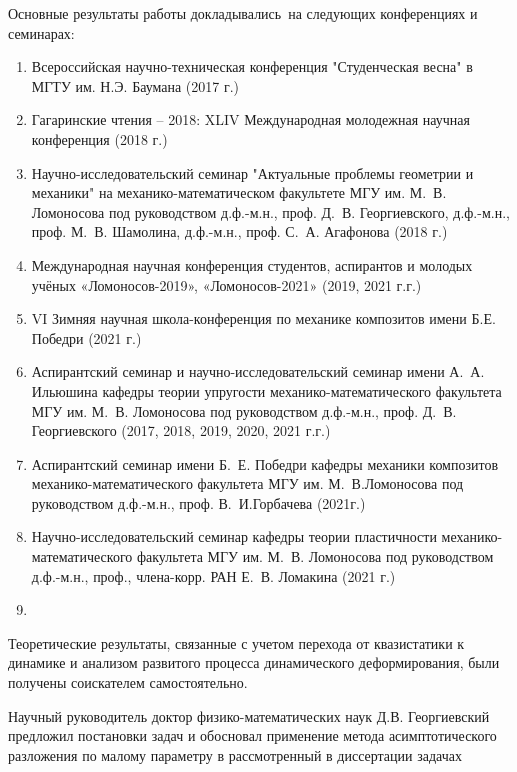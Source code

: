 {\probation}
Основные результаты работы докладывались~на следующих конференциях и семинарах:
\begin{enumerate}[beginpenalty=10000] %
    \item Всероссийская научно-техническая конференция "Студенческая весна" в МГТУ им. Н.Э. Баумана (2017 г.)
    \item Гагаринские чтения -- 2018: XLIV Международная молодежная научная конференция (2018 г.)
    \item Научно-исследовательский семинар "Актуальные проблемы геометрии и механики" на механико-математическом факультете МГУ им. М.~В. Ломоносова под руководством д.ф.-м.н., проф. Д.~В. Георгиевского, д.ф.-м.н., проф. М.~В. Шамолина, д.ф.-м.н., проф. С.~А. Агафонова (2018 г.)
    \item Международная научная конференция студентов, аспирантов и молодых учёных «Ломоносов-2019», «Ломоносов-2021» (2019, 2021 г.г.)
    \item VI Зимняя научная школа-конференция по механике композитов имени Б.Е. Победри (2021 г.)
    \item Аспирантский семинар и научно-исследовательский семинар имени А.~А. Ильюшина кафедры теории упругости механико-математического факультета МГУ им. М.~В. Ломоносова под руководством д.ф.-м.н., проф. Д.~В. Георгиевского (2017, 2018, 2019, 2020, 2021 г.г.)
    \item Аспирантский семинар имени Б.~Е. Победри кафедры механики композитов механико-математического факультета МГУ им. М.~В.Ломоносова под руководством д.ф.-м.н., проф. В.~И.Горбачева (2021г.)
    \item Научно-исследовательский семинар кафедры теории пластичности механико-математического факультета МГУ им. М.~В. Ломоносова под руководством д.ф.-м.н., проф., члена-корр. РАН Е.~В. Ломакина (2021 г.)
    \item {}
\end{enumerate}

{\contribution} Теоретические результаты, связанные с учетом перехода от квазистатики к динамике и анализом развитого процесса динамического деформирования, были получены соискателем самостоятельно.

Научный руководитель доктор физико-математических наук Д.В. Георгиевский предложил постановки задач и обосновал применение метода асимптотического разложения по малому параметру в рассмотренный в диссертации задачах

